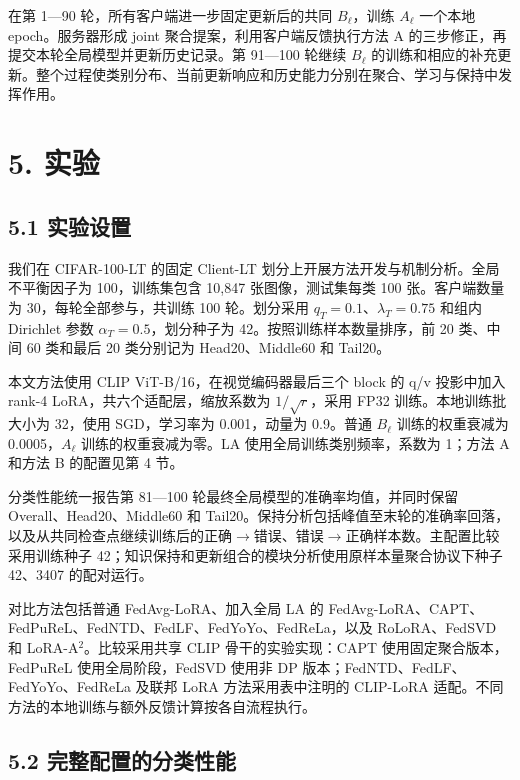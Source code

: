 \documentclass[UTF8,a4paper,10pt,fontset=fandol]{ctexart}
\begin{document}
在第 1—90 轮，所有客户端进一步固定更新后的共同 $B_\ell$，训练 $A_\ell$ 一个本地 epoch。服务器形成 joint 聚合提案，利用客户端反馈执行方法 A 的三步修正，再提交本轮全局模型并更新历史记录。第 91—100 轮继续 $B_\ell$ 的训练和相应的补充更新。整个过程使类别分布、当前更新响应和历史能力分别在聚合、学习与保持中发挥作用。


\section*{5. 实验}

\subsection*{5.1 实验设置}

我们在 CIFAR-100-LT 的固定 Client-LT 划分上开展方法开发与机制分析。全局不平衡因子为 100，训练集包含 10,847 张图像，测试集每类 100 张。客户端数量为 30，每轮全部参与，共训练 100 轮。划分采用 $q_T=0.1$、$\lambda_T=0.75$ 和组内 Dirichlet 参数 $\alpha_T=0.5$，划分种子为 42。按照训练样本数量排序，前 20 类、中间 60 类和最后 20 类分别记为 Head20、Middle60 和 Tail20。


本文方法使用 CLIP ViT-B/16，在视觉编码器最后三个 block 的 q/v 投影中加入 rank-4 LoRA，共六个适配层，缩放系数为 $1/\sqrt r$，采用 FP32 训练。本地训练批大小为 32，使用 SGD，学习率为 0.001，动量为 0.9。普通 $B_\ell$ 训练的权重衰减为 0.0005，$A_\ell$ 训练的权重衰减为零。LA 使用全局训练类别频率，系数为 1；方法 A 和方法 B 的配置见第 4 节。


分类性能统一报告第 81—100 轮最终全局模型的准确率均值，并同时保留 Overall、Head20、Middle60 和 Tail20。保持分析包括峰值至末轮的准确率回落，以及从共同检查点继续训练后的正确$\rightarrow$错误、错误$\rightarrow$正确样本数。主配置比较采用训练种子 42；知识保持和更新组合的模块分析使用原样本量聚合协议下种子 42、3407 的配对运行。


对比方法包括普通 FedAvg-LoRA、加入全局 LA 的 FedAvg-LoRA、CAPT、FedPuReL、FedNTD、FedLF、FedYoYo、FedReLa，以及 RoLoRA、FedSVD 和 LoRA-A$^2$。比较采用共享 CLIP 骨干的实验实现：CAPT 使用固定聚合版本，FedPuReL 使用全局阶段，FedSVD 使用非 DP 版本；FedNTD、FedLF、FedYoYo、FedReLa 及联邦 LoRA 方法采用表中注明的 CLIP-LoRA 适配。不同方法的本地训练与额外反馈计算按各自流程执行。


\subsection*{5.2 完整配置的分类性能}
\end{document}
